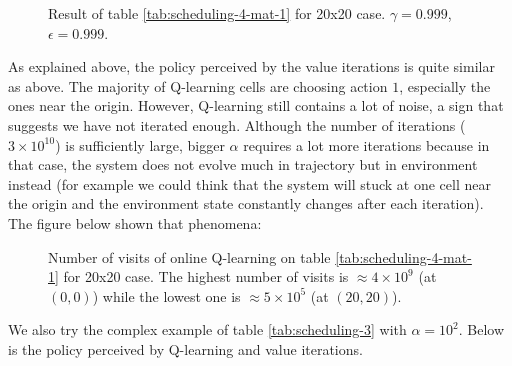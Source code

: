 \documentclass[
  a4paper, xcolor = usenames,dvipsnames]{article}
\theoremstyle{definition}
\theoremstyle{definition}
\theoremstyle{definition}
\theoremstyle{definition}
\theoremstyle{remark}
\begin{document}
\begin{figure}

{\centering {}

}

\caption{Result of table \ref{tab:scheduling-4-mat-1} for 20x20 case. \(\gamma = 0.999\), \(\epsilon = 0.999\).}\label{fig:20x20-scheduling-4}
\end{figure}

As explained above, the policy perceived by the value iterations is quite similar as above. The majority of Q-learning cells are choosing action \(1\), especially the ones near the origin. However, Q-learning still contains a lot of noise, a sign that suggests we have not iterated enough. Although the number of iterations (\(3 \times 10^{10}\)) is sufficiently large, bigger \(\alpha\) requires a lot more iterations because in that case, the system does not evolve much in trajectory but in environment instead (for example we could think that the system will stuck at one cell near the origin and the environment state constantly changes after each iteration). The figure below shown that phenomena:



\begin{figure}

{\centering {}

}

\caption{Number of visits of online Q-learning on table \ref{tab:scheduling-4-mat-1} for 20x20 case. The highest number of visits is \(\approx 4 \times 10^{9}\) (at \((0, 0)\)) while the lowest one is \(\approx 5 \times 10^5\) (at \((20, 20)\)).}\label{fig:20x20-scheduling-4-n-visit}
\end{figure}

We also try the complex example of table \ref{tab:scheduling-3} with \(\alpha = 10^{2}\). Below is the policy perceived by Q-learning and value iterations.
\end{document}
